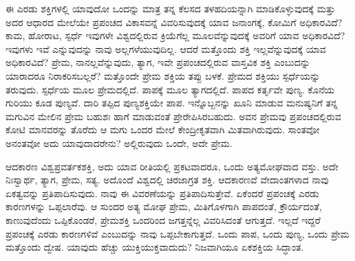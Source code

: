 \vskip 0.2cm


ಈ ಎರಡು ಶಕ್ತಿಗಳಲ್ಲಿ ಯಾವುದೋ ಒಂದನ್ನು ಮಾತ್ರ ತನ್ನ ಕೆಲಸದ ತಳಹದಿಯನ್ನಾಗಿ ಮಾಡಿಕೊಳ್ಳುವುದಕ್ಕೆ ಮತ್ತು ಅದರ ಆಧಾರದ ಮೇಲೆಯೇ ಪ್ರಪಂಚದ ವಿಕಾಸವನ್ನೆ ವಿವರಿಸುವುದಕ್ಕೆ ಯಾವ ಜನಾಂಗಕ್ಕೆ, ಕೋಮಿಗೆ ಅಧಿಕಾರವಿದೆ? ಕಾಮ, ಹೋರಾಟ, ಸ್ಪರ್ಧೆ ಇವುಗಳೇ ವಿಶ್ವದಲ್ಲಿರುವ ಕ್ರಿಯೆಗೆಲ್ಲ ಮೂಲವೆನ್ನುವುದಕ್ಕೆ ಅವರಿಗೆ ಯಾವ ಅಧಿಕಾರವಿದೆ? ಇವುಗಳು ಇವೆ ಎನ್ನುವುದನ್ನು ನಾವು ಅಲ್ಲಗಳೆಯುವುದಿಲ್ಲ. ಆದರೆ ಮತ್ತೊಂದು ಶಕ್ತಿ ಇಲ್ಲವೆನ್ನುವುದಕ್ಕೆ ಯಾವ ಅಧಿಕಾರವಿದೆ? ಪ್ರೇಮ, ನಾನಲ್ಲವೆನ್ನುವುದು, ತ್ಯಾಗ, ಇವೇ ಪ್ರಪಂಚದಲ್ಲಿರುವ ವಾಸ್ತವಿಕ ಶಕ್ತಿ ಎಂಬುದನ್ನು ಯಾರಾದರೂ ನಿರಾಕರಿಸಬಲ್ಲರೆ? ಮತ್ತೊಂದೇ ಪ್ರೇಮ ಶಕ್ತಿಯ ತಪ್ಪು ಬಳಕೆ. ಪ್ರೇಮದ ಶಕ್ತಿಯು ಸ್ಪರ್ಧೆಯನ್ನು ತರುವುದು. ಸ್ಪರ್ಧೆಯ ಮೂಲ ಪ್ರೇಮದಲ್ಲಿದೆ. ಪಾಪಕ್ಕೆ ಮೂಲ ತ್ಯಾಗದಲ್ಲಿದೆ. ಪಾಪದ ಕರ್ತೃವೇ ಪುಣ್ಯ. ಕೊನೆಯ ಗುರಿಯು ಕೂಡ ಪುಣ್ಯವೆ. ದಾರಿ ತಪ್ಪಿದ ಪುಣ್ಯಶಕ್ತಿಯೇ ಪಾಪ. ಇನ್ನೊಬ್ಬನನ್ನು ಖೂನಿ ಮಾಡುವ ಮನುಷ್ಯನಿಗೆ ತನ್ನ ಮಗುವಿನ ಮೇಲಿನ ಪ್ರೇಮ ಬಹುಶಃ ಹಾಗೆ ಮಾಡುವಂತೆ ಪ್ರೇರೇಪಿಸಿರಬಹುದು. ಅವನ ಪ್ರೇಮವು ಪ್ರಪಂಚದಲ್ಲಿರುವ ಕೋಟಿ ಮಾನವರನ್ನು ತೊರೆದು ಆ ಮಗು ಒಂದರ ಮೇಲೆ ಕೇಂದ್ರೀಕೃತವಾಗಿ ಮಿತವಾಗಿರುವುದು. ಸಾಂತವೋ ಅನಂತವೋ ಅದು ಯಾವುದಾದರೇನು? ಅಲ್ಲಿರುವುದು ಒಂದೇ, ಅದೇ ಪ್ರೇಮ. 

\vskip 0.2cm

ಆದಕಾರಣ ವಿಶ್ವಪ್ರವರ್ತಕಶಕ್ತಿ, ಅದು ಯಾವ ರೀತಿಯಲ್ಲಿ ಪ್ರಕಟವಾದರೂ, ಒಂದು ಅತ್ಯಮೋಘವಾದ ವಸ್ತು. ಅದೇ ನಿಃಸ್ವಾರ್ಥ, ತ್ಯಾಗ, ಪ್ರೇಮ, ಸತ್ಯ. ಅದೊಂದೆ ವಿಶ್ವದಲ್ಲಿ ಚಿರಜಾಗ್ರತ ಶಕ್ತಿ. ಆದಕಾರಣವೆ ವೇದಾಂತಗಳಾದ ನಾವು ಏಕತ್ವವನ್ನು ಪ್ರತಿಪಾದಿಸುವುದು. ನಾವು ಈ ವಿವರಣೆಯನ್ನು ಪ್ರತಿಪಾದಿಸುತ್ತೇವೆ. ಏಕೆಂದರೆ ಪ್ರಪಂಚಕ್ಕೆ ಎರಡು ಕಾರಣಗಳನ್ನು ಒಪ್ಪಲಾರೆವು. ಆ ಸುಂದರ ಅತ್ಯ ಮೋಘ ಪ್ರೇಮ, ಮಿತಿಗೊಳಗಾಗಿ ಪಾಪದಂತೆ, ಕ್ರೌರ್ಯದಂತೆ, ಕಾಣುವುದೆಂದು ಒಪ್ಪಿಕೊಂಡರೆ, ಪ್ರೇಮಶಕ್ತಿ ಒಂದರಿಂದ ಜಗತ್ತನ್ನೆಲ್ಲ ವಿವರಿಸಿದಂತೆ ಆಗುತ್ತದೆ. ಇಲ್ಲದೆ ಇದ್ದರೆ ಪ್ರಪಂಚಕ್ಕೆ ಎರಡು ಕಾರಣಗಳಿವೆ ಎಂಬುದನ್ನು ನಾವು ಒಪ್ಪಬೇಕಾಗುತ್ತದೆ. ಒಂದು ಪಾಪ, ಒಂದು ಪುಣ್ಯ, ಒಂದು ಪ್ರೇಮ ಮತ್ತೊಂದು ದ್ವೇಷ. ಯಾವುದು ಹೆಚ್ಚು ಯುಕ್ತಿಯುಕ್ತವಾದುದು? ನಿಜವಾಗಿಯೂ ಏಕಶಕ್ತಿಯ ಸಿದ್ಧಾಂತ. 

\vskip 0.2cm

